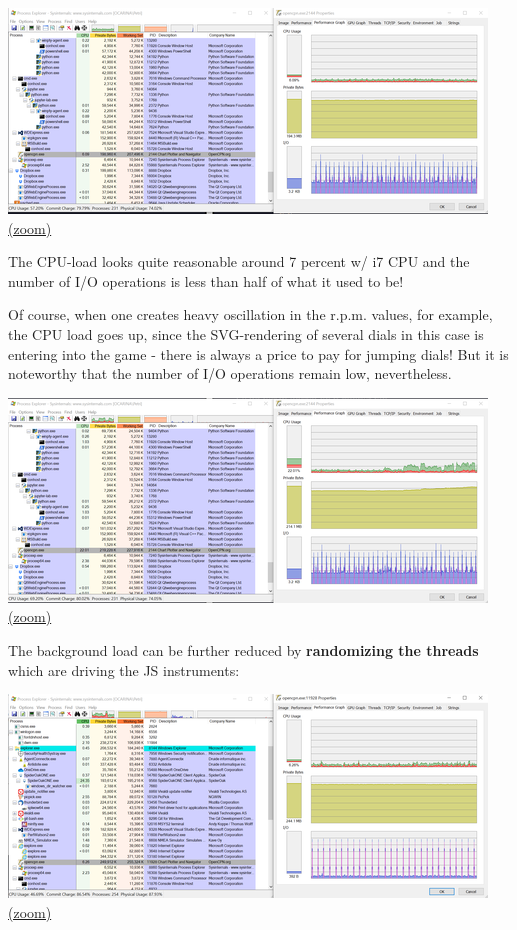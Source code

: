 \documentclass[11pt]{article}
\begin{document}
    \includegraphics{2020-01-20_dgb_procexp_12_instrucjs_clients_alpha_02.png}
\href{img/2020-01-20_dgb_procexp_12_instrucjs_clients_alpha_02.png}{(zoom)}

    The CPU-load looks quite reasonable around 7 percent w/ i7 CPU and the
number of I/O operations is less than half of what it used to be!

    Of course, when one creates heavy oscillation in the r.p.m. values, for
example, the CPU load goes up, since the SVG-rendering of several dials
in this case is entering into the game - there is always a price to pay
for jumping dials! But it is noteworthy that the number of I/O
operations remain low, nevertheless.

    \includegraphics{2020-01-20_dgb_procexp_12_instrucjs_clients_alpha_02_cont_changes.png}
\href{img/2020-01-20_dgb_procexp_12_instrucjs_clients_alpha_02_cont_changes.png}{(zoom)}

    The background load can be further reduced by \textbf{randomizing the
threads} which are driving the JS instruments:

    \includegraphics{2020-01-22_dgb_procexp_12_instrucjs_clients_alpha_02_randomized_threads.png}
\href{img/2020-01-22_dgb_procexp_12_instrucjs_clients_alpha_02_randomized_threads.png}{(zoom)}
\end{document}
